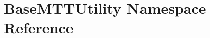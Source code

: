 \hypertarget{namespaceBaseMTTUtility}{\section{Base\-M\-T\-T\-Utility Namespace Reference}
\label{namespaceBaseMTTUtility}
}
